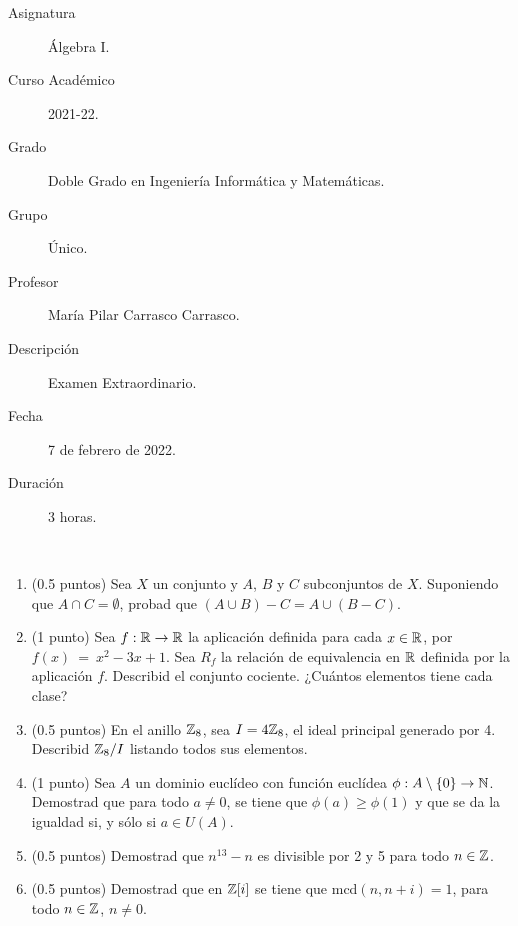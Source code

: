 \documentclass[12pt]{article}
\begin{document}

    
    

    
    \begin{description}
        \item[Asignatura] Álgebra I.
        \item[Curso Académico] 2021-22.
        \item[Grado] Doble Grado en Ingeniería Informática y Matemáticas.
        \item[Grupo] Único.
        \item[Profesor] María Pilar Carrasco Carrasco.
        \item[Descripción] Examen Extraordinario.
        \item[Fecha] 7 de febrero de 2022.
        \item[Duración] 3 horas.
    
    \end{description}
    \newpage
    
    \begin{ejercicio}[4 puntos]
        \ 
        \begin{enumerate} 
            \item (0.5 puntos) Sea $X$ un conjunto y $A$, $B$ y $C$ subconjuntos de $X$. Suponiendo que $A \cap C = \emptyset$, probad que $(A \cup B)-C=A\cup (B-C)$.
            \item (1 punto) Sea $f:\mathbb{R}\rightarrow \mathbb{R}$ la aplicación definida para cada $x \in \mathbb{R}$, por $f(x)~=~x^2-3x+1$. Sea $R_f$ la relación de equivalencia en $\mathbb{R}$ definida por la aplicación $f$. Describid el conjunto cociente. ¿Cuántos elementos tiene cada clase?
            \item (0.5 puntos) En el anillo $\mathbb{Z}_8$, sea $I = 4\mathbb{Z}_8$, el ideal principal generado por 4. Describid $\mathbb{Z}_8/I$ listando todos sus elementos.
            \item (1 punto) Sea $A$ un dominio euclídeo con función euclídea $\phi:A \setminus \{0\}\rightarrow \mathbb{N}$. Demostrad que para todo $a \neq 0$, se tiene que $\phi(a) \geq \phi(1)$ y que se da la igualdad si, y sólo si $a \in U(A)$.
            \item (0.5 puntos) Demostrad que $n^{13}-n$ es divisible por 2 y 5 para todo $n \in \mathbb{Z}$.
            \item (0.5 puntos) Demostrad que en $\mathbb{Z}[i]$ se tiene que mcd$(n,n+i) = 1$, para todo $n \in \mathbb{Z}$, $n \neq 0$.
        \end{enumerate} 
    \end{ejercicio}
    
\end{document}
